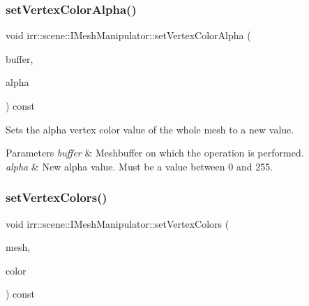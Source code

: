 \subsubsection{\texorpdfstring{set\+Vertex\+Color\+Alpha()}{setVertexColorAlpha()}\hspace{0.1cm}{\footnotesize\ttfamily [4/4]}}
{\footnotesize\ttfamily void irr\+::scene\+::\+I\+Mesh\+Manipulator\+::set\+Vertex\+Color\+Alpha (\begin{DoxyParamCaption}\item[{\hyperlink{classirr_1_1scene_1_1IMeshBuffer}{I\+Mesh\+Buffer} $\ast$}]{buffer,  }\item[{\hyperlink{namespaceirr_ac66849b7a6ed16e30ebede579f9b47c6}{s32}}]{alpha }\end{DoxyParamCaption}) const\hspace{0.3cm}{\ttfamily [inline]}}



Sets the alpha vertex color value of the whole mesh to a new value. 


\begin{DoxyParams}{Parameters}
{\em buffer} & Meshbuffer on which the operation is performed. \\
\hline
{\em alpha} & New alpha value. Must be a value between 0 and 255. \\
\hline
\end{DoxyParams}
\mbox{\label{classirr_1_1scene_1_1IMeshManipulator_a72bc31cb9468480698277f0f164e71ee}} 
\subsubsection{\texorpdfstring{set\+Vertex\+Colors()}{setVertexColors()}\hspace{0.1cm}{\footnotesize\ttfamily [1/4]}}
{\footnotesize\ttfamily void irr\+::scene\+::\+I\+Mesh\+Manipulator\+::set\+Vertex\+Colors (\begin{DoxyParamCaption}\item[{\hyperlink{classirr_1_1scene_1_1IMesh}{I\+Mesh} $\ast$}]{mesh,  }\item[{\hyperlink{classirr_1_1video_1_1SColor}{video\+::\+S\+Color}}]{color }\end{DoxyParamCaption}) const\hspace{0.3cm}{\ttfamily [inline]}}



